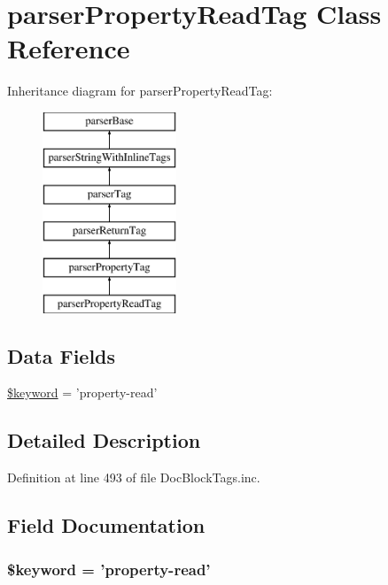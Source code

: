 \hypertarget{classparser_property_read_tag}{\section{parser\-Property\-Read\-Tag \-Class \-Reference}
\label{classparser_property_read_tag}
}
\-Inheritance diagram for parser\-Property\-Read\-Tag\-:\begin{figure}[H]
\begin{center}
\leavevmode
\includegraphics[height=6.000000cm]{classparser_property_read_tag}
\end{center}
\end{figure}
\subsection*{\-Data \-Fields}
\begin{DoxyCompactItemize}
\item 
\hyperlink{classparser_property_read_tag_a4a925d6b38bcf3957c713a7d3dc7da1f}{\$keyword} = 'property-\/read'
\end{DoxyCompactItemize}


\subsection{\-Detailed \-Description}


\-Definition at line 493 of file \-Doc\-Block\-Tags.\-inc.



\subsection{\-Field \-Documentation}
\hypertarget{classparser_property_read_tag_a4a925d6b38bcf3957c713a7d3dc7da1f}{
\subsubsection[{\$keyword}]{\setlength{\rightskip}{0pt plus 5cm}\$keyword = 'property-\/read'}}\label{classparser_property_read_tag_a4a925d6b38bcf3957c713a7d3dc7da1f}


